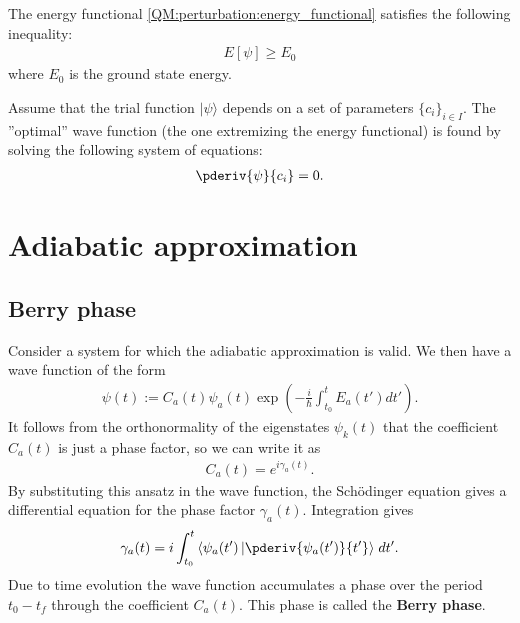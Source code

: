 
    \begin{property}
        The energy functional \ref{QM:perturbation:energy_functional} satisfies the following inequality:
        \begin{gather}
            E[\psi] \geq E_0
        \end{gather}
        where $E_0$ is the ground state energy.
    \end{property}

    \begin{method}
        Assume that the trial function $|\psi\rangle$ depends on a set of parameters $\{c_i\}_{i\in I}$. The ''optimal'' wave function (the one extremizing the energy functional) is found by solving the following system of equations:
        \begin{gather}
            \pderiv{\psi}{c_i} = 0.
        \end{gather}
    \end{method}

\section{Adiabatic approximation}
\subsection{Berry phase}

    Consider a system for which the adiabatic approximation is valid. We then have a wave function of the form
    \begin{gather}
        \psi(t) := C_a(t)\psi_a(t)\exp\left(-\frac{i}{\hbar}\int_{t_0}^tE_a(t')dt'\right).
    \end{gather}
    It follows from the orthonormality of the eigenstates $\psi_k(t)$ that the coefficient $C_a(t)$ is just a phase factor, so we can write it as
    \begin{gather}
        C_a(t) = e^{i\gamma_a(t)}.
    \end{gather}
    By substituting this ansatz in the wave function, the Sch\"odinger equation gives a differential equation for the phase factor $\gamma_a(t)$. Integration gives
    \begin{gather}
        \label{QM:perturbation:berry:phase_factor}
        \gamma_a(t) = i\int_{t_0}^t\left\langle\psi_a(t')\left|\pderiv{\psi_a(t')}{t'}\right\rangle\right. dt'.
    \end{gather}
    Due to time evolution the wave function accumulates a phase over the period $t_0-t_f$ through the coefficient $C_a(t)$. This phase is called the \textbf{Berry phase}.

